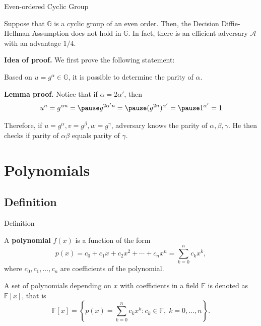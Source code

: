 \documentclass{beamer}
\begin{document}
    \begin{frame}{Even-ordered Cyclic Group}
        \begin{theorem}
            Suppose that $\mathbb{G}$ is a cyclic group of an even order. Then, the Decision
            Diffie-Hellman Assumption does not hold in $\mathbb{G}$. In fact, there is an efficient adversary $\mathcal{A}$ with an advantage $1/4$.\pause
        \end{theorem}

        \textbf{Idea of proof.} We first prove the following statement:

        \begin{lemma}
            Based on $u = g^{\alpha} \in \mathbb{G}$, it is possible to determine the parity of $\alpha$.
        \end{lemma}

        \pause\textbf{Lemma proof.} Notice that if $\alpha=2\alpha'$, then
        \begin{equation*}
            u^n = g^{\alpha n} =\pause g^{2\alpha' n} =\pause (g^{2n})^{\alpha'} =\pause 1^{\alpha'} = 1
        \end{equation*}

        \pause Therefore, if $u = g^{\alpha}, v = g^{\beta}, w = g^{\gamma}$, adversary knows the parity of $\alpha, \beta, \gamma$. He then checks if parity of $\alpha\beta$ equals parity of $\gamma$.
    \end{frame}

    \section{Polynomials}

    \subsection{Definition}

    \begin{frame}{Definition}
      \begin{definition}
        A \textbf{polynomial} $f(x)$ is a function of the form
        \begin{equation*}
            p(x) = c_0 + c_1 x + c_2 x^2 + \cdots + c_n x^n = \sum_{k=0}^{n} c_k x^k,
        \end{equation*}
        where $c_0, c_1, \dots, c_n$ are coefficients of the polynomial.\pause
    \end{definition}
    
    \begin{definition}
        A set of polynomials depending on $x$ with coefficients in a field $\mathbb{F}$ is denoted as $\mathbb{F}[x]$, that is
        \begin{equation*}
            \mathbb{F}[x] = \left\{p(x) = \sum_{k=0}^{n} c_k x^k: c_k \in \mathbb{F}, \; k = 0,\dots,n\right\}.
        \end{equation*}
    \end{definition}
    \end{frame}
\end{document}
